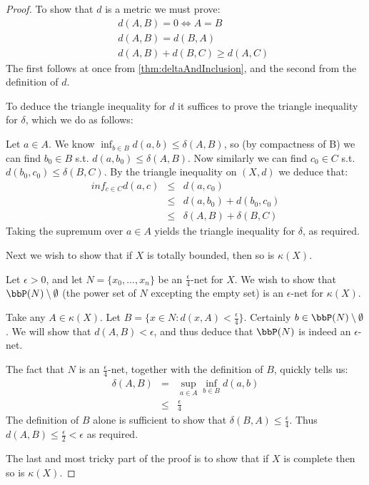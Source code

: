 \documentclass[a4paper,11pt]{article}
\begin{document}
\begin{proof}
To show that $d$ is a metric we must prove:
\begin{eqnarray*}
&&d(A,B)=0 \iff A=B \\
&&d(A,B)=d(B,A) \\
&&d(A,B)+d(B,C)\geq d(A,C)
\end{eqnarray*}
%
The first follows at once from \ref{thm:deltaAndInclusion}, and the second from
the definition of $d$.

To deduce the triangle inequality for $d$ it suffices to prove the triangle
inequality for $\delta$, which we do as follows:

Let $a\in A$.  We know $\inf_{b\in B}d(a,b)\leq\delta(A,B)$, so (by compactness
of B) we can find $b_0\in B$ s.t.
$d(a,b_0)\leq\delta(A,B)$.  Now similarly we can
find $c_0\in C$ s.t. $d(b_0,c_0)\leq\delta(B,C)$.
By the triangle inequality on
$(X,d)$ we deduce that:
%
\begin{eqnarray*}
inf_{c\in C}d(a,c)&\leq&d(a,c_0) \\
  &\leq& d(a,b_0)+d(b_0,c_0) \\
  &\leq& \delta(A,B)+\delta(B,C)
\end{eqnarray*}
%
Taking the supremum over $a\in A$ yields the triangle inequality for $\delta$,
as required.

Next we wish to show that if $X$ is totally bounded, then so is $\kappa(X)$.

Let $\epsilon>0$, and let $N=\{x_0,\ldots,x_n\}$ be an $\frac{\epsilon}{4}$-net
for $X$.  We wish to show that
$\bbP(N)\setminus\emptyset$ (the power set of $N$
excepting the empty set) is an
$\epsilon$-net for $\kappa(X)$.

Take any $A\in\kappa(X)$.  Let $B=\{x\in N:d(x,A)<\frac{\epsilon}{4}\}$.
Certainly $b\in\bbP(N)\setminus\emptyset$.  We
will show that $d(A,B)<\epsilon$, and thus deduce that $\bbP(N)$ is indeed an
$\epsilon$-net.

The fact that $N$ is an $\frac{\epsilon}{4}$-net, together with the definition
of $B$, quickly tells us:
%
\begin{eqnarray*}
\delta(A,B)
  &=& \sup_{a\in A}\inf_{b\in B}d(a,b) \\
  &\leq& \frac{\epsilon}{4}
\end{eqnarray*}
%
The definition of $B$ alone is sufficient to show that
$\delta(B,A)\leq\frac{\epsilon}{4}$.  Thus
$d(A,B)\leq\frac{\epsilon}{2}<\epsilon$ as required.

The last and most tricky part of the proof is to show that if $X$ is complete
then so is $\kappa(X)$.


\end{proof}
\end{document}
